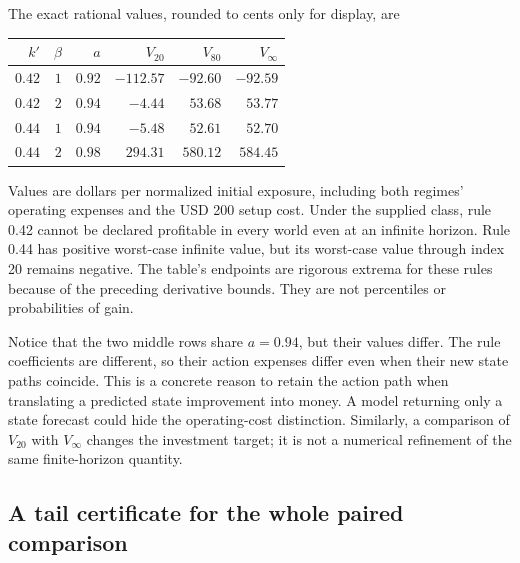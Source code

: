 The exact rational values, rounded to cents only for display, are
\begin{center}
\begin{tabular}{rrrrrr}
\toprule
$k'$ & $\beta$ & $a$ & $V_{20}$ & $V_{80}$ & $V_\infty$\\
\midrule
$0.42$ & $1$ & $0.92$ & $-112.57$ & $-92.60$ & $-92.59$\\
$0.42$ & $2$ & $0.94$ & $-4.44$ & $53.68$ & $53.77$\\
$0.44$ & $1$ & $0.94$ & $-5.48$ & $52.61$ & $52.70$\\
$0.44$ & $2$ & $0.98$ & $294.31$ & $580.12$ & $584.45$\\
\bottomrule
\end{tabular}
\end{center}
Values are dollars per normalized initial exposure, including both regimes'
operating expenses and the USD 200 setup cost. Under the supplied class,
rule 0.42 cannot be declared profitable in every world even at an infinite
horizon. Rule 0.44 has positive worst-case infinite value, but its
worst-case value through index 20 remains negative. The table's endpoints
are rigorous extrema for these rules because of the preceding derivative
bounds. They are not percentiles or probabilities of gain.

Notice that the two middle rows share $a=0.94$, but their values differ.
The rule coefficients are different, so their action expenses differ even
when their new state paths coincide. This is a concrete reason to retain
the action path when translating a predicted state improvement into money.
A model returning only a state forecast could hide the operating-cost
distinction. Similarly, a comparison of $V_{20}$ with $V_\infty$ changes
the investment target; it is not a numerical refinement of the same
finite-horizon quantity.

\subsection{A tail certificate for the whole paired comparison}

